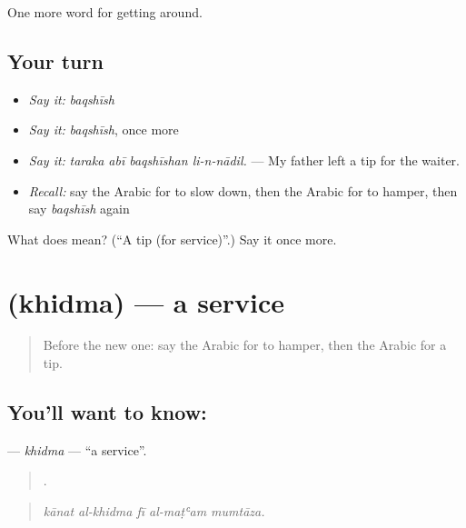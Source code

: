 \begin{grammarlens}[title={What you've built}]
One more word for getting around.
\end{grammarlens}

\subsection*{Your turn}
\begin{itemize}
\raggedright
  \item \emph{Say it:} \emph{baqshīsh}
  \item \emph{Say it:} \emph{baqshīsh}, once more
  \item \emph{Say it:} \emph{taraka abī baqshīshan li-n-nādil.} — My father left a tip for the waiter.
  \item \emph{Recall:} say the Arabic for to slow down, then the Arabic for to hamper, then say \emph{baqshīsh} again
\end{itemize}

\begin{tcolorbox}[breakable,colback=teal!4,colframe=teal!35!black,title={Before you move on}]
What does  mean? (\textquotedblleft{}A tip (for service)\textquotedblright{}.) Say it once more.
\end{tcolorbox}
\section[\texorpdfstring{\ar{خدمة} (khidma)}{خدمة (khidma)}]{ (khidma) — a service}

\label{lesson:AR-C446-khidma}



\begin{quote}
Before the new one: say the Arabic for to hamper, then the Arabic for a tip.
\end{quote}

\subsection*{You'll want to know: }
\textbf{} — \emph{khidma} — \textquotedblleft{}a service\textquotedblright{}.

\begin{quote}
    .
\end{quote}

\begin{quote}
\emph{kānat al-khidma fī al-maṭʿam mumtāza.}
\end{quote}

